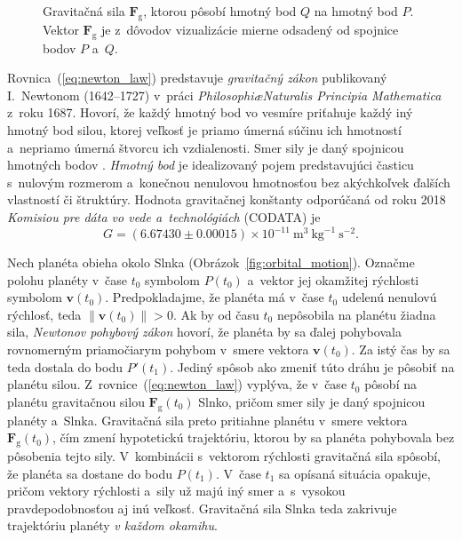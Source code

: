 \documentclass[a4paper,12pt]{book}
\newcommand{\gidx}{\mathrm g}
\let\vec\mathbf
\begin{document}
\begin{figure}[b]
\centering

\caption{Gravitačná sila $\vec F_\gidx$, ktorou pôsobí hmotný bod $Q$ na hmotný 
bod $P$.  Vektor $\vec F_\gidx$ je z~dôvodov vizualizácie mierne odsadený od 
spojnice bodov $P$ a~$Q$.}
\label{fig:newton_law}
\end{figure}

Rovnica~(\ref{eq:newton_law}) predstavuje \emph{gravitačný zákon} publikovaný
I.~Newtonom (1642--1727) v~práci \emph{Philosophi\ae Naturalis Principia
Mathematica} z~roku 1687.  Hovorí, že každý hmotný bod vo vesmíre priťahuje
každý iný hmotný bod silou, ktorej veľkosť je priamo úmerná súčinu ich 
hmotností a~nepriamo úmerná štvorcu ich vzdialenosti.  Smer sily je daný 
spojnicou hmotných bodov \parencite{Kellogg1967}.  \emph{Hmotný bod} je 
idealizovaný pojem predstavujúci časticu s~nulovým rozmerom a~konečnou 
nenulovou hmotnosťou bez akýchkoľvek ďalších vlastností či štruktúry.  Hodnota 
gravitačnej konštanty odporúčaná od roku 2018 \emph{Komisiou pre dáta vo vede 
a~technológiách} (CODATA) je
%
\begin{equation}
G = (6.67430 \pm 0.00015) \times 10^{-11} \ \mathrm{m}^3 \ \mathrm{kg}^{-1}
\ \mathrm{s}^{-2}{.}
\end{equation}

Nech planéta obieha okolo Slnka (Obrázok~\ref{fig:orbital_motion}).  Označme 
polohu planéty v~čase $t_0$ symbolom $P(t_0)$ a~vektor jej okamžitej rýchlosti 
symbolom $\vec v(t_0)$.  Predpokladajme, že planéta má v~čase $t_0$ udelenú 
nenulovú rýchlosť, teda $\| \vec v(t_0) \| > 0$.  Ak by od času $t_0$ 
nepôsobila na planétu žiadna sila, \emph{Newtonov pohybový zákon} hovorí, že 
planéta by sa ďalej pohybovala rovnomerným priamočiarym pohybom v~smere vektora 
$\vec v(t_0)$.  Za istý čas by sa teda dostala do bodu $P'(t_1)$.  Jediný 
spôsob ako zmeniť túto dráhu je pôsobiť na planétu silou.  
Z~rovnice~(\ref{eq:newton_law}) vyplýva, že v~čase $t_0$ pôsobí na planétu 
gravitačnou silou $\vec F_\gidx(t_0)$ Slnko, pričom smer sily je daný spojnicou 
planéty a~Slnka.  Gravitačná sila preto pritiahne planétu v~smere vektora $\vec 
F_\gidx(t_0)$, čím zmení hypotetickú trajektóriu, ktorou by sa planéta 
pohybovala bez pôsobenia tejto sily.  V~kombinácii s~vektorom rýchlosti 
gravitačná sila spôsobí, že planéta sa dostane do bodu $P(t_1)$.  V~čase $t_1$ 
sa opísaná situácia opakuje, pričom vektory rýchlosti a~sily už majú iný smer 
a~s~vysokou pravdepodobnosťou aj inú veľkosť.  Gravitačná sila Slnka teda 
zakrivuje trajektóriu planéty \emph{v každom okamihu}.
\end{document}
